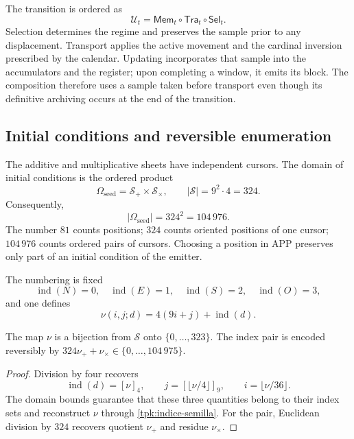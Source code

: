 The transition is ordered as
\begin{equation}
 \mathcal U_t=\mathsf{Mem}_t\circ\mathsf{Tra}_t\circ\mathsf{Sel}_t.
 \label{tpk:composicion}
\end{equation}
Selection determines the regime and preserves the sample prior to any
displacement. Transport applies the active movement and the cardinal inversion
prescribed by the calendar. Updating incorporates that sample
into the accumulators and the register; upon completing a window, it emits its block.
The composition therefore uses a sample taken before transport even though
its definitive archiving occurs at the end of the transition.

\subsection{Initial conditions and reversible enumeration}
\label{tpk:semillas}

The additive and multiplicative sheets have independent cursors. The
domain of initial conditions is the ordered product
\[
 \Omega_{\mathrm{seed}}=\mathcal S_+\times\mathcal S_\times,
 \qquad |\mathcal S|=9^2\cdot4=324.
\]
Consequently,
\begin{equation}
 |\Omega_{\mathrm{seed}}|=324^2=104\,976.
 \label{tpk:censo-inicial}
\end{equation}
The number \(81\) counts positions; \(324\) counts oriented positions
of one cursor; \(104\,976\) counts ordered pairs of cursors. Choosing
a position in APP preserves only part of an initial condition
of the emitter.

The numbering is fixed
\[
 \operatorname{ind}(N)=0,\quad\operatorname{ind}(E)=1,\quad
 \operatorname{ind}(S)=2,\quad\operatorname{ind}(O)=3,
\]
and one defines
\begin{equation}
 \nu(i,j;d)=4(9i+j)+\operatorname{ind}(d).
 \label{tpk:indice-semilla}
\end{equation}

\begin{proposicion}
\label{tpk:enumeracion}
The map \(\nu\) is a bijection from \(\mathcal S\) onto
\(\{0,\ldots,323\}\). The index pair is encoded reversibly
by \(324\nu_++\nu_\times\in\{0,\ldots,104\,975\}\).
\end{proposicion}
\begin{proof}
Division by four recovers
\[
 \operatorname{ind}(d)=[\nu]_4,\qquad
 j=[\lfloor\nu/4\rfloor]_9,\qquad i=\lfloor\nu/36\rfloor.
\]
The domain bounds guarantee that these three quantities belong to
their index sets and reconstruct \(\nu\) through
\eqref{tpk:indice-semilla}. For the pair, Euclidean division by
\(324\) recovers quotient \(\nu_+\) and residue \(\nu_\times\).
\end{proof}

